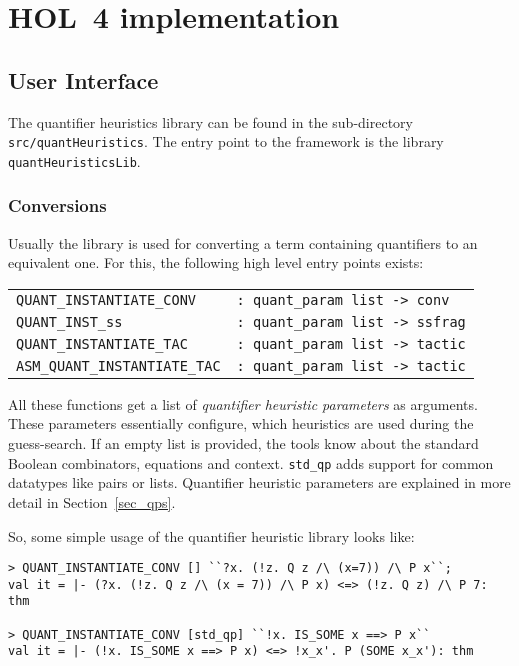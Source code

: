 \documentclass[a4paper,12pt,DIV=12,oneside]{scrbook}
\theoremstyle{definition}
\theoremstyle{remark}
\begin{document}
\chapter{HOL~4 implementation}

\section{User Interface}\label{sec_interface}

The quantifier heuristics library can be found in the sub-directory
\texttt{src/quantHeuristics}.  The entry point to the framework is the
library \texttt{quantHeuristicsLib}. 

\subsection{Conversions}
Usually the library is used for
converting a term containing quantifiers to an equivalent one. For this,
the following high level entry points exists:
\bigskip

\noindent
\begin{tabular}{@{}ll}
\texttt{QUANT\_INSTANTIATE\_CONV} & \texttt{: quant\_param list -> conv} \\
\texttt{QUANT\_INST\_ss} & \texttt{: quant\_param list -> ssfrag} \\
\texttt{QUANT\_INSTANTIATE\_TAC} & \texttt{: quant\_param list -> tactic} \\
\texttt{ASM\_QUANT\_INSTANTIATE\_TAC} & \texttt{: quant\_param list -> tactic} 
\end{tabular}
\bigskip

All these functions get a list of \emph{quantifier heuristic parameters} as arguments. These
parameters essentially configure, which heuristics are used during the guess-search. If
an empty list is provided, the tools know about the standard Boolean combinators, equations and context.
\texttt{std\_qp} adds support for common datatypes like pairs or lists. 
Quantifier heuristic parameters are explained in more detail in 
Section~\ref{sec_qps}.

So, some simple usage of the quantifier heuristic library looks like:
{\scriptsize
\begin{verbatim}
> QUANT_INSTANTIATE_CONV [] ``?x. (!z. Q z /\ (x=7)) /\ P x``;
val it = |- (?x. (!z. Q z /\ (x = 7)) /\ P x) <=> (!z. Q z) /\ P 7: thm

> QUANT_INSTANTIATE_CONV [std_qp] ``!x. IS_SOME x ==> P x``
val it = |- (!x. IS_SOME x ==> P x) <=> !x_x'. P (SOME x_x'): thm
\end{verbatim}}
\end{document}

